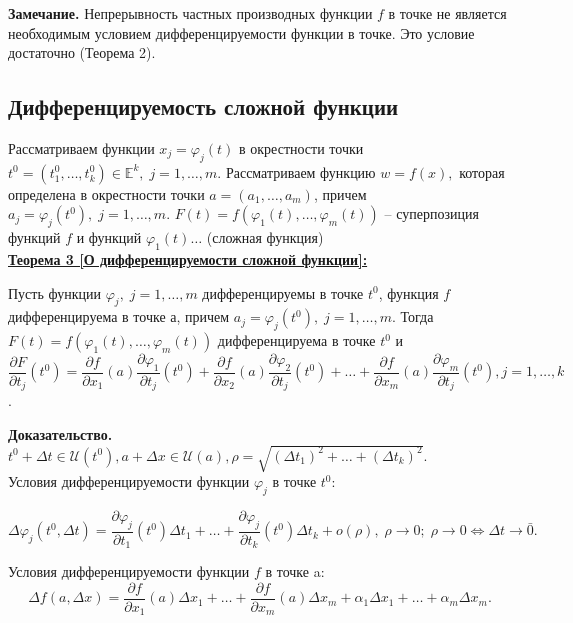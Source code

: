 \documentclass[a4paper,12pt]{article} %
\begin{document}
	\textbf{Замечание.} Непрерывность частных производных функции $f$ в точке не является необходимым условием дифференцируемости функции в точке. Это условие достаточно (Теорема 2).\\
	
	\subsection{Дифференцируемость сложной функции}
	
	Рассматриваем функции $x_j = \varphi_j(t)$ в окрестности точки $t^0 = (t_1^0, \ldots, t_k^0)\in \mathds{E}^k, \; j = 1, \ldots, m$. Рассматриваем функцию $w = f(x),$ которая определена в окрестности точки $a = (a_1, \ldots, a_m)$, причем $a_j = \varphi_j(t^0), \; j = 1, \ldots, m$. $F(t) = f(\varphi_1(t), \ldots, \varphi_m(t))$ -- суперпозиция функций $f$ и функций $\varphi_1(t) \ldots$ (сложная функция)\\
	
	\underline{\textbf{Теорема 3 [О дифференцируемости сложной функции]:}}
	
	Пусть функции $\varphi_j, \; j = 1, \ldots, m$ дифференцируемы в точке $t^0$, функция $f$ дифференцируема в точке $а$, причем $a_j = \varphi_j(t^0), \; j = 1, \ldots,m$. Тогда $F(t) = f(\varphi_1(t), \ldots, \varphi_m(t))$ дифференцируема в точке $t^0$ и 
	\[\frac{\partial F}{\partial t_j}(t^0) = \frac{\partial f}{\partial x_1}(a) \frac{\partial \varphi_1}{\partial t_j}(t^0	) + \frac{\partial f}{\partial x_2}(a) \frac{\partial \varphi_2}{\partial t_j}(t^0	) + \ldots + \frac{\partial f}{\partial x_m}(a) \frac{\partial \varphi_m}{\partial t_j}(t^0), j = 1, \ldots, k\].
	
	\textbf{Доказательство.} $t^0 + \Delta t \in \mathscr{U}(t^0), a + \Delta x \in \mathscr{U}(a), \rho = \sqrt{(\Delta t_1)^2 + \ldots + (\Delta t_k)^2}$.\\
	
	Условия дифференцируемости функции $\varphi_j$ в точке $t^0$:
	
	\[\Delta \varphi_j(t^0, \Delta t) = \frac{\partial \varphi_j}{\partial t_1}(t^0)\Delta t_1 + \ldots + \frac{\partial \varphi_j}{\partial t_k}(t^0)\Delta t_k + o(\rho), \; \rho \to 0; \; \rho \to 0 \Leftrightarrow \Delta t \to \bar0.\]
	
	Условия дифференцируемости функции $f$ в точке a:
	\[\Delta f(a, \Delta x) = \frac {\partial f}{\partial x_1}(a)\Delta x_1 + \ldots + \frac {\partial f}{\partial x_m}(a)\Delta x_m + \alpha_1 \Delta x_1 + \ldots + \alpha_m \Delta x_m.\]
	
\end{document}
